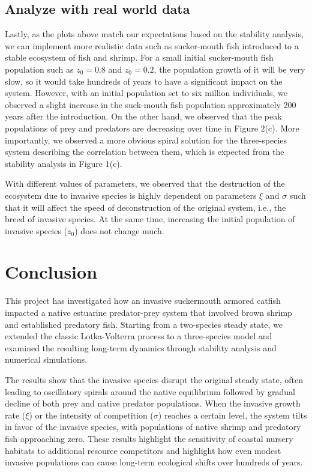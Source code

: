 \documentclass{article}
\begin{document}
\subsection*{Analyze with real world data}

\noindent Lastly, as the plots above match our expectations based on the stability analysis, we can implement more realistic data such as sucker-mouth fish introduced to a stable ecosystem of fish and shrimp. For a small initial sucker-mouth fish population such as $z_0=0.8$ and $z_0=0.2$, the population growth of it will be very slow, so it would take hundreds of years to have a significant impact on the system. However, with an initial population set to six million individuals, we observed a slight increase in the suck-mouth fish population approximately 200 years after the introduction. On the other hand, we observed that the peak populations of prey and predators are decreasing over time in Figure 2(c). More importantly, we observed a more obvious spiral solution for the three-species system describing the correlation between them, which is expected from the stability analysis in Figure 1(c).

\vspace{5mm}

\noindent With different values of parameters, we observed that the destruction of the ecosystem due to invasive species is highly dependent on parameters $\xi$ and $\sigma$ such that it will affect the speed of deconstruction of the original system, i.e., the breed of invasive species. At the same time, increasing the initial population of invasive species ($z_0$) does not change much. 

\section{Conclusion} %
This project has investigated how an invasive suckermouth armored catfish impacted a native estuarine predator-prey system that involved brown shrimp and established predatory fish. Starting from a two-species steady state, we extended the classic Lotka-Volterra process to a three-species model and examined the resulting long-term dynamics through stability analysis and numerical simulations.

\vspace{5mm}

\noindent The results show that the invasive species disrupt the original steady state, often leading to oscillatory spirals around the native equilibrium followed by gradual decline of both prey and native predator populations. When the invasive growth rate ($\xi$) or the intensity of competition ($\sigma$) reaches a certain level, the system tilts in favor of the invasive species, with populations of native shrimp and predatory fish approaching zero. These results highlight the sensitivity of coastal nursery habitats to additional resource competitors and highlight how even modest invasive populations can cause long-term ecological shifts over hundreds of years.
\end{document}
